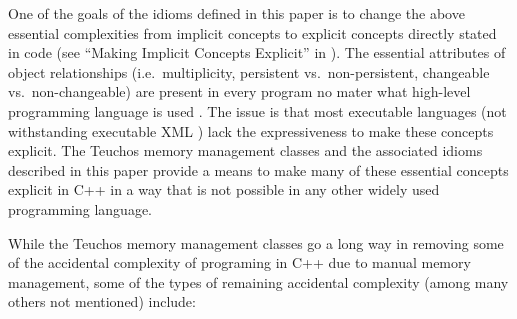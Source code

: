 \documentclass[pdf,ps2pdf,11pt]{SANDreport}
\begin{document}
One of the goals of the idioms defined in this paper is to change the
above essential complexities from implicit concepts to explicit
concepts directly stated in code (see ``Making Implicit Concepts
Explicit'' in {}\cite[Chapter 9]{DomainDrivenDesign}).  The essential
attributes of object relationships (i.e.\ multiplicity, persistent
vs.\ non-persistent, changeable vs.\ non-changeable) are present in
every program no mater what high-level programming language is used
{}\cite{MythicalManMonth95, CodeComplete2nd04,
WorkingEffectivelyWithLegacyCode05}.  The issue is that most
executable languages (not withstanding executable XML {}\cite[Chapter
1]{UMLDistilledThirdEdition04}) lack the expressiveness to make these
concepts explicit.  The Teuchos memory management classes and the
associated idioms described in this paper provide a means to make many
of these essential concepts explicit in C++ in a way that is not
possible in any other widely used programming language.

While the Teuchos memory management classes go a long way in removing
some of the accidental complexity of programing in C++ due to manual
memory management, some of the types of remaining accidental
complexity (among many others not mentioned) include:
\end{document}
